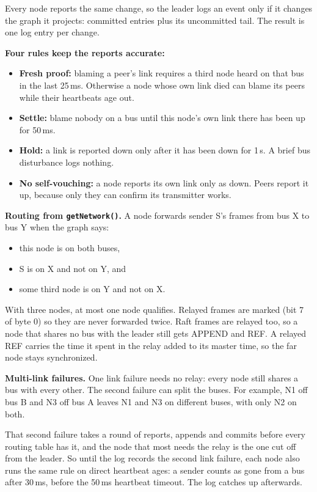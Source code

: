 \documentclass[10pt]{article}
\begin{document}
Every node reports the same change, so the leader logs an event only if it changes the graph it projects: committed entries plus its uncommitted tail. The result is one log entry per change.

\textbf{Four rules keep the reports accurate:}
\begin{itemize}
  \item \textbf{Fresh proof:} blaming a peer's link requires a third node heard on that bus in the last 25\,ms. Otherwise a node whose own link died can blame its peers while their heartbeats age out.
  \item \textbf{Settle:} blame nobody on a bus until this node's own link there has been up for 50\,ms.
  \item \textbf{Hold:} a link is reported down only after it has been down for 1\,s. A brief bus disturbance logs nothing.
  \item \textbf{No self-vouching:} a node reports its own link only as down. Peers report it up, because only they can confirm its transmitter works.
\end{itemize}

\textbf{Routing from \texttt{getNetwork()}.} A node forwards sender S's frames from bus X to bus Y when the graph says:
\begin{itemize}
  \item this node is on both buses,
  \item S is on X and not on Y, and
  \item some third node is on Y and not on X.
\end{itemize}
With three nodes, at most one node qualifies. Relayed frames are marked (bit 7 of byte 0) so they are never forwarded twice. Raft frames are relayed too, so a node that shares no bus with the leader still gets APPEND and REF. A relayed REF carries the time it spent in the relay added to its master time, so the far node stays synchronized.

\textbf{Multi-link failures.} One link failure needs no relay: every node still shares a bus with every other. The second failure can split the buses. For example, N1 off bus B and N3 off bus A leaves N1 and N3 on different buses, with only N2 on both.

That second failure takes a round of reports, appends and commits before every routing table has it, and the node that most needs the relay is the one cut off from the leader. So until the log records the second link failure, each node also runs the same rule on direct heartbeat ages: a sender counts as gone from a bus after 30\,ms, before the 50\,ms heartbeat timeout. The log catches up afterwards.
\end{document}
